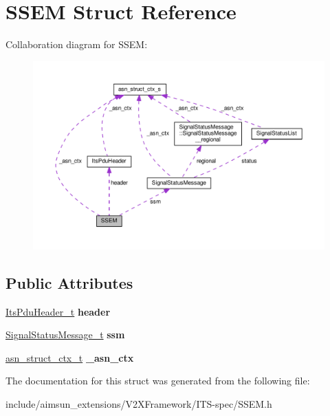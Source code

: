 \hypertarget{structSSEM}{}\section{S\+S\+EM Struct Reference}
\label{structSSEM}


Collaboration diagram for S\+S\+EM\+:\nopagebreak
\begin{figure}[H]
\begin{center}
\leavevmode
\includegraphics[width=350pt]{structSSEM__coll__graph}
\end{center}
\end{figure}
\subsection*{Public Attributes}
\begin{DoxyCompactItemize}
\item 
\hyperlink{structItsPduHeader}{Its\+Pdu\+Header\+\_\+t} {\bfseries header}\hypertarget{structSSEM_a91788f57145463ef45ed538168d42baf}{}\label{structSSEM_a91788f57145463ef45ed538168d42baf}

\item 
\hyperlink{structSignalStatusMessage}{Signal\+Status\+Message\+\_\+t} {\bfseries ssm}\hypertarget{structSSEM_a762d6f0999c27fa6cb270a3c173d0915}{}\label{structSSEM_a762d6f0999c27fa6cb270a3c173d0915}

\item 
\hyperlink{structasn__struct__ctx__s}{asn\+\_\+struct\+\_\+ctx\+\_\+t} {\bfseries \+\_\+asn\+\_\+ctx}\hypertarget{structSSEM_a33382560d9410108c426e33f829d27f7}{}\label{structSSEM_a33382560d9410108c426e33f829d27f7}

\end{DoxyCompactItemize}


The documentation for this struct was generated from the following file\+:\begin{DoxyCompactItemize}
\item 
include/aimsun\+\_\+extensions/\+V2\+X\+Framework/\+I\+T\+S-\/spec/S\+S\+E\+M.\+h\end{DoxyCompactItemize}
